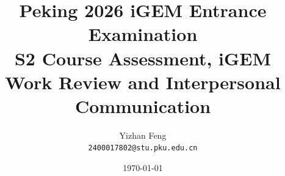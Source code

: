 \title{\textbf{Peking 2026 iGEM Entrance Examination} \\[0.5em]
    \Large S2 Course Assessment, iGEM Work Review and Interpersonal Communication}
\author{Yizhan Feng \\ 
    \normalsize{\texttt{2400017802@stu.pku.edu.cn}}}
\date{\today}